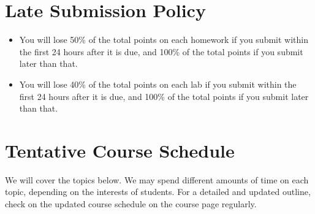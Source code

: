 \documentclass[11pt, a4paper]{article}
\begin{document}
\section{Late Submission Policy} 
\begin{itemize}
	\item  You will lose 50\% of the total points on each homework if you submit within the first 24 hours after it is due, and 100\% of the total points if you submit later than that.
	\item You will lose 40\% of the total points on each lab if you submit within the first 24 hours after it is due, and 100\% of the total points if you submit later than that.
\end{itemize}


\section{Tentative Course Schedule} 
We will cover the topics below. We may spend different amounts of time on each topic, depending on the interests of students. For a detailed and updated outline, check on the updated course schedule on the course page regularly. 
\end{document}
